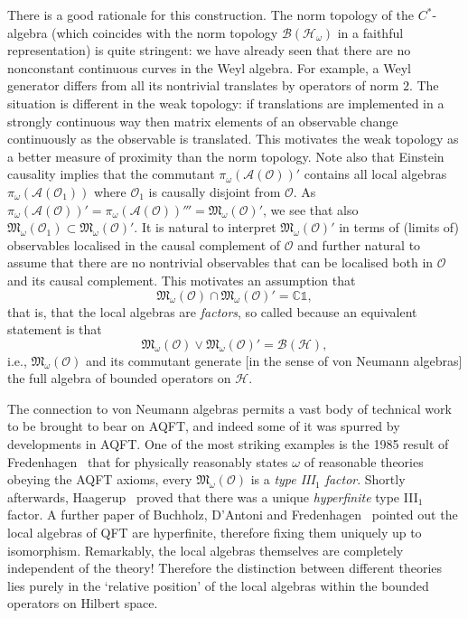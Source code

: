 \documentclass[12pt,a4paper]{article}
\newcommand{\1}{\mathds{1}}                         %
\newcommand{\CC}{\mathbb{C}}           %
\newcommand{\Ocal}{\mathcal{O}}
\newcommand{\BB}{{\mathcal{B}}}
\newcommand{\HH}{{\mathcal{H}}}
\newcommand{\Mf}{{\mathfrak{M}}}
\newcommand{\II}{{\mathbb{1}}}
\newcommand{\Ac}{{\mathcal{A}}}
\begin{document}
There is a good rationale for this construction. The norm topology of the $C^*$-algebra (which coincides with the norm topology $\BB(\HH_\omega)$ in a faithful representation) is quite stringent: we have already seen that there are no nonconstant continuous curves in the Weyl algebra. For example, a Weyl generator differs from all its nontrivial translates by operators of norm $2$. The situation is different in the weak topology: if translations are implemented in a strongly continuous way then matrix elements of an observable change continuously as the observable is translated. This motivates the weak topology as a better measure of proximity than the norm topology. Note also that Einstein causality implies that the commutant $\pi_\omega(\Ac(\Ocal))'$ contains all local algebras $\pi_\omega(\Ac(\Ocal_1))$ 
where $\Ocal_1$ is causally disjoint from $\Ocal$. As $\pi_\omega(\Ac(\Ocal))'=\pi_\omega(\Ac(\Ocal))'''=\Mf_\omega(\Ocal)'$, we see that also $\Mf_\omega(\Ocal_1) \subset \Mf_\omega(\Ocal)'$. It is natural to interpret $\Mf_\omega(\Ocal)'$ in terms of (limits of) observables localised in the causal complement of $\Ocal$ and further natural to assume that
there are no nontrivial observables that can be localised both in $\Ocal$ and its causal complement. This motivates an assumption that
\[
\Mf_\omega(\Ocal)\cap \Mf_\omega(\Ocal)' = \CC\II,
\]
that is, that the local algebras are \emph{factors}, so called because an equivalent statement is that
\[
\Mf_\omega(\Ocal)\vee \Mf_\omega(\Ocal)' = \BB(\HH),
\]
i.e., $\Mf_\omega(\Ocal)$ and its commutant generate [in the sense of von Neumann algebras] the full algebra of bounded operators on $\HH$.


The connection to von Neumann algebras permits a vast body of technical work to be brought to bear on AQFT, and indeed some of it was spurred by developments in AQFT. One of the most striking examples is the 1985 result of Fredenhagen~\cite{Fredenhagen:1985} that for physically reasonably states $\omega$ of reasonable theories obeying the AQFT axioms, every $\Mf_\omega(\Ocal)$ is a \emph{type  III${}_1$ factor}. Shortly afterwards, Haagerup~\cite{Haagerup:1987} proved that there was a unique \emph{hyperfinite} type III${}_1$ factor. A further paper of Buchholz, D'Antoni and Fredenhagen~\cite{BucDAnFre:1987} pointed out the local algebras of QFT are hyperfinite, therefore fixing them uniquely up to isomorphism. Remarkably, the local algebras themselves are completely independent of the theory! Therefore the distinction between different theories lies purely in the `relative position' of the local algebras within the bounded operators on Hilbert space.
\end{document}
